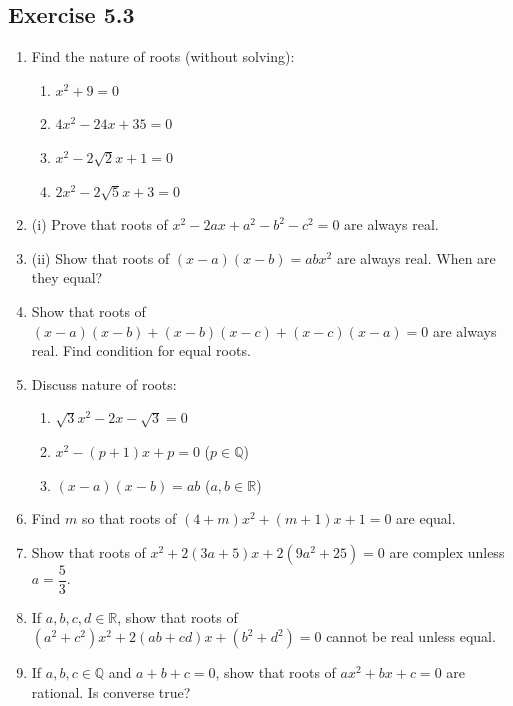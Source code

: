 \documentclass[12pt,a4paper]{article}
\begin{document}
\subsection{Exercise 5.3}

\begin{enumerate}
    \item Find the nature of roots (without solving):
    \begin{enumerate}[label=(\roman*)]
        \item \( x^2 + 9 = 0 \)
        \item \( 4x^2 - 24x + 35 = 0 \)
        \item \( x^2 - 2\sqrt{2}x + 1 = 0 \)
        \item \( 2x^2 - 2\sqrt{5}x + 3 = 0 \)
    \end{enumerate}

    \item (i) Prove that roots of \( x^2 - 2ax + a^2 - b^2 - c^2 = 0 \) are always real.
    \item (ii) Show that roots of \( (x-a)(x-b) = abx^2 \) are always real. When are they equal?

    \item Show that roots of \( (x-a)(x-b) + (x-b)(x-c) + (x-c)(x-a) = 0 \) are always real. Find condition for equal roots.

    \item Discuss nature of roots:
    \begin{enumerate}[label=(\roman*)]
        \item \( \sqrt{3}x^2 - 2x - \sqrt{3} = 0 \)
        \item \( x^2 - (p+1)x + p = 0 \) (\( p \in \mathbb{Q} \))
        \item \( (x-a)(x-b) = ab \) (\( a,b \in \mathbb{R} \))
    \end{enumerate}

    \item Find \( m \) so that roots of \( (4+m)x^2 + (m+1)x + 1 = 0 \) are equal.

    \item Show that roots of \( x^2 + 2(3a+5)x + 2(9a^2 + 25) = 0 \) are complex unless \( a = \dfrac{5}{3} \).

    \item If \( a,b,c,d \in \mathbb{R} \), show that roots of \( (a^2 + c^2)x^2 + 2(ab+cd)x + (b^2 + d^2) = 0 \) cannot be real unless equal.

    \item If \( a,b,c \in \mathbb{Q} \) and \( a+b+c = 0 \), show that roots of \( ax^2 + bx + c = 0 \) are rational. Is converse true?


\end{enumerate}
\end{document}
